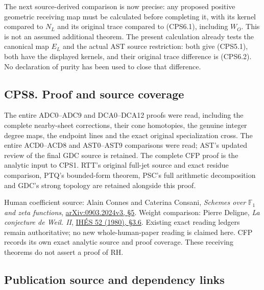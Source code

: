 The next source-derived comparison is now precise: any proposed positive
geometric receiving map must be calculated before completing it, with
its kernel compared to \(N_L\) and its original trace compared to
(CPS6.1), including \(W_O\). This is not an assumed additional theorem.
The present calculation already tests the canonical map \(E_L\) and the
actual AST source restriction: both give (CPS5.1), both have the
displayed kernels, and their original trace difference is (CPS6.2). No
declaration of purity has been used to close that difference.

\subsection{CPS8. Proof and source
coverage}\label{cps8.-proof-and-source-coverage}

The entire ADC0--ADC9 and DCA0--DCA12 proofs were read, including the
complete nearby-sheet corrections, their cone homotopies, the genuine
integer degree maps, the endpoint lines and the exact original
specialization cross. The entire ACD0--ACD8 and AST0--AST9 comparisons
were read; AST's updated review of the final GDC source is retained. The
complete CFP proof is the analytic input to CPS1. RTT's original
full-jet source and exact residue comparison, PTQ's bounded-form
theorem, PSC's full arithmetic decomposition and GDC's strong topology
are retained alongside this proof.

Human coefficient source: Alain Connes and Caterina Consani,
\emph{Schemes over} \(\mathbb F_1\) \emph{and zeta functions},
\href{https://arxiv.org/abs/0903.2024v3}{arXiv:0903.2024v3, §5}. Weight
comparison: Pierre Deligne, \emph{La conjecture de Weil. II},
\href{https://numdam.org/item/PMIHES_1980__52__137_0/}{IHÉS 52 (1980),
§3.6}. Existing exact reading ledgers remain authoritative; no new
whole-human-paper reading is claimed here. CFP records its own exact
analytic source and proof coverage. These receiving theorems do not
assert a proof of RH.

\subsection{Publication source and dependency
links}\label{publication-source-and-dependency-links}

